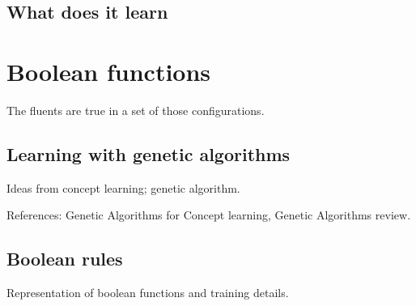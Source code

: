 \subsection{What does it learn}


\section{Boolean functions}

The fluents are true in a set of those configurations.

\subsection{Learning with genetic algorithms}

Ideas from concept learning; genetic algorithm.

References:
Genetic Algorithms for Concept learning\cite{bib:ga-for-concepts},
Genetic Algorithms review\cite{bib:ga-mutations-review}.

\subsection{Boolean rules}

Representation of boolean functions and training details.
